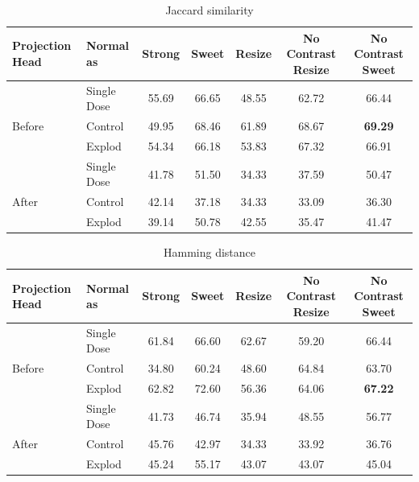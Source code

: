 \begin{table}[H]
  \centering
  \begin{tabular}{@{}llccccc@{}}
  \toprule
  Projection Head & Normal as       & Strong & Sweet & Resize & No Contrast Resize & No Contrast Sweet \\ \midrule
                  & Single Dose    & 55.69      & 66.65     & 48.55      & 62.72                  & 66.44                 \\
  Before          & Control        & 49.95      & 68.46     & 61.89      & 68.67                  & \textbf{69.29}                 \\
                  & Explod         & 54.34      & 66.18     & 53.83      & 67.32                  & 66.91                 \\ \midrule
                  & Single Dose    & 41.78      & 51.50     & 34.33      & 37.59                  & 50.47                 \\
  After           & Control        & 42.14      & 37.18     & 34.33      & 33.09                  & 36.30                 \\
                  & Explod         & 39.14      & 50.78     & 42.55      & 35.47                  & 41.47                 \\ \bottomrule
  \end{tabular}
  \caption{Jaccard similarity}
  \label{tab:table_label}
\end{table}

\begin{table}[H]
  \centering
  \begin{tabular}{@{}llccccc@{}}
  \toprule
  Projection Head & Normal as       & Strong & Sweet & Resize & No Contrast Resize & No Contrast Sweet \\ \midrule
                  & Single Dose    & 61.84      & 66.60     & 62.67      & 59.20                  & 66.44                 \\
  Before          & Control        & 34.80      & 60.24     & 48.60      & 64.84                  & 63.70                 \\
                  & Explod         & 62.82      & 72.60     & 56.36      & 64.06                  & \textbf{67.22}                 \\ \midrule
                  & Single Dose    & 41.73      & 46.74     & 35.94      & 48.55                  & 56.77                 \\
  After           & Control        & 45.76      & 42.97     & 34.33      & 33.92                  & 36.76                 \\
                  & Explod         & 45.24      & 55.17     & 43.07      & 43.07                  & 45.04                \\ \bottomrule
  \end{tabular}
  \caption{Hamming  distance}
  \label{tab:table_label}
\end{table}

